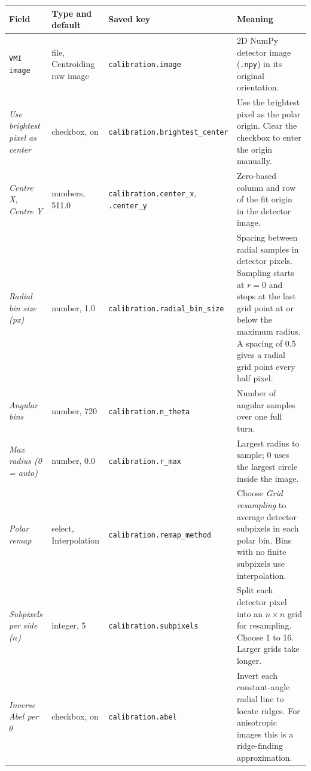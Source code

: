 \documentclass[11pt,a4paper]{article}
\newcommand{\code}[1]{\texttt{#1}}
\begin{document}
\begin{center}
\footnotesize
\begin{longtable}{@{}L{3.6cm}L{3.1cm}L{2.9cm}L{6.3cm}@{}}
\toprule
Field & Type and default & Saved key & Meaning \\
\midrule
\endhead
\bottomrule
\endfoot
\code{VMI image} & file, Centroiding raw image &
\code{calibration.\allowbreak{}image} & 2D NumPy detector image (\code{.\allowbreak{}npy})
in its original orientation. \\
\addlinespace
\emph{Use brightest pixel as center} & checkbox, on &
\code{calibration.\allowbreak{}brightest\_\allowbreak{}center} & Use the brightest
pixel as the polar origin. Clear the checkbox to enter the origin manually. \\
\addlinespace
\emph{Centre X}, \emph{Centre Y} & numbers, 511.0 & \code{calibration.\allowbreak{}center\_\allowbreak{}x},
\code{.\allowbreak{}center\_\allowbreak{}y} & Zero-based column and row of the fit
origin in the detector image. \\
\addlinespace
\emph{Radial bin size (px)} & number, 1.0 &
\code{calibration.\allowbreak{}radial\_\allowbreak{}bin\_\allowbreak{}size} &
Spacing between radial samples in detector pixels. Sampling starts at $r=0$
and stops at the last grid point at or below the maximum radius. A spacing of
0.5 gives a radial grid point every half pixel. \\
\addlinespace
\emph{Angular bins} & number, 720 & \code{calibration.\allowbreak{}n\_\allowbreak{}theta} &
Number of angular samples over one full turn. \\
\addlinespace
\emph{Max radius (0 = auto)} & number, 0.0 & \code{calibration.\allowbreak{}r\_\allowbreak{}max} &
Largest radius to sample; 0 uses the largest circle inside the image. \\
\addlinespace
\emph{Polar remap} & select, Interpolation &
\code{calibration.\allowbreak{}remap\_\allowbreak{}method} &
Choose \emph{Grid resampling} to average detector subpixels in each polar
bin. Bins with no finite subpixels use interpolation. \\
\addlinespace
\emph{Subpixels per side ($n$)} & integer, 5 &
\code{calibration.\allowbreak{}subpixels} &
Split each detector pixel into an $n\times n$ grid for resampling.
Choose 1 to 16. Larger grids take longer. \\
\addlinespace
\emph{Inverse Abel per $\theta$} & checkbox, on & \code{calibration.\allowbreak{}abel} &
Invert each constant-angle radial line to locate ridges. For anisotropic
images this is a ridge-finding approximation. \\

\end{longtable}
\end{center}
\end{document}
